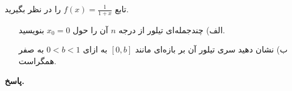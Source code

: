 تابع
\(f(x) = \frac{1}{1+x}\)
را در نظر بگیرید.
\begin{enumerate}
	\item[الف)]چندجمله‌ای تیلور از درجه
	\(n\)
آن را حول
\(x_0=0\)
 بنویسید.
	\vspace*{.3cm}
	\item[ب)] 
نشان دهید سری تیلور آن بر بازه‌ای مانند
\([0,b]\)
به ازای
\(0<b<1\)
به صفر همگراست.
\end{enumerate}



\begin{answer}

	\textbf{پاسخ.}
	
\end{answer}
